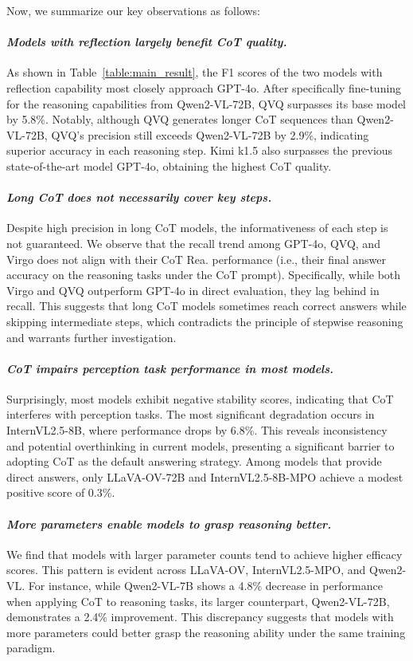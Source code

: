 Now, we summarize our key observations as follows:
\paragraph{\textit{Models with reflection largely benefit CoT quality.}}
As shown in Table~\ref{table:main_result}, the F1 scores of the two models with reflection capability most closely approach GPT-4o. After specifically fine-tuning for the reasoning capabilities from Qwen2-VL-72B, QVQ surpasses its base model by 5.8\%. Notably, although QVQ generates longer CoT sequences than Qwen2-VL-72B, QVQ's precision still exceeds Qwen2-VL-72B by 2.9\%, indicating superior accuracy in each reasoning step. Kimi k1.5 also surpasses the previous state-of-the-art model GPT-4o, obtaining the highest CoT quality.


\paragraph{\textit{Long CoT does not necessarily cover key steps.}} 
Despite high precision in long CoT models, the informativeness of each step is not guaranteed. We observe that the recall trend among GPT-4o, QVQ, and Virgo does not align with their CoT Rea. performance (i.e., their final answer accuracy on the reasoning tasks under the CoT prompt). Specifically, while both Virgo and QVQ outperform GPT-4o in direct evaluation, they lag behind in recall. This suggests that long CoT models sometimes reach correct answers while skipping intermediate steps, which contradicts the principle of stepwise reasoning and warrants further investigation.

\paragraph{\textit{CoT impairs perception task performance in most models.}}%
Surprisingly, most models exhibit negative stability scores, indicating that CoT interferes with perception tasks. The most significant degradation occurs in InternVL2.5-8B, where performance drops by 6.8\%. This reveals inconsistency and potential overthinking in current models, presenting a significant barrier to adopting CoT as the default answering strategy. Among models that provide direct answers, only LLaVA-OV-72B and InternVL2.5-8B-MPO achieve a modest positive score of 0.3\%.

\paragraph{\textit{More parameters enable models to grasp reasoning better.}} 
We find that models with larger parameter counts tend to achieve higher efficacy scores. This pattern is evident across LLaVA-OV, InternVL2.5-MPO, and Qwen2-VL. For instance, while Qwen2-VL-7B shows a 4.8\% decrease in performance when applying CoT to reasoning tasks, its larger counterpart, Qwen2-VL-72B, demonstrates a 2.4\% improvement. This discrepancy suggests that models with more parameters could better grasp the reasoning ability under the same training paradigm. 



